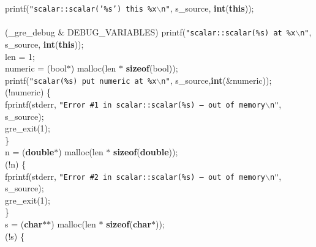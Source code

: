 \begin{flushleft}
\hspace*{4\indentation}printf({\tt"scalar::scalar('\%s') this \%x$\backslash$n"}, s\_source, {\bf int}({\bf this}));\mbox{}\\
\mbox{}\\
\hspace*{4\indentation}{\bf if} (\_gre\_debug \& DEBUG\_VARIABLES) printf({\tt"scalar::scalar(\%s) at \%x$\backslash$n"}, s\_source, {\bf int}({\bf this}));\mbox{}\\
\hspace*{4\indentation}len = 1;\mbox{}\\
\hspace*{4\indentation}numeric = (bool$\ast$) malloc(len $\ast$ {\bf sizeof}(bool));\mbox{}\\
\hspace*{4\indentation}printf({\tt"scalar(\%s) put numeric at \%x$\backslash$n"}, s\_source,{\bf int}(\&numeric));\mbox{}\\
\hspace*{4\indentation}{\bf if} (!numeric) \{\mbox{}\\
\hspace*{8\indentation}fprintf(stderr, {\tt"Error \#1 in scalar::scalar(\%s) -- out of memory$\backslash$n"}, s\_source);\mbox{}\\
\hspace*{8\indentation}gre\_exit(1);\mbox{}\\
\hspace*{4\indentation}\}\mbox{}\\
\hspace*{4\indentation}n = ({\bf double}$\ast$) malloc(len $\ast$ {\bf sizeof}({\bf double}));\mbox{}\\
\hspace*{4\indentation}{\bf if} (!n) \{\mbox{}\\
\hspace*{8\indentation}fprintf(stderr, {\tt"Error \#2 in scalar::scalar(\%s) -- out of memory$\backslash$n"}, s\_source);\mbox{}\\
\hspace*{8\indentation}gre\_exit(1);\mbox{}\\
\hspace*{4\indentation}\}\mbox{}\\
\hspace*{4\indentation}s = ({\bf char}$\ast$$\ast$) malloc(len $\ast$ {\bf sizeof}({\bf char}$\ast$));\mbox{}\\
\hspace*{4\indentation}{\bf if} (!s) \{\mbox{}\\
$$
\end{flushleft}
